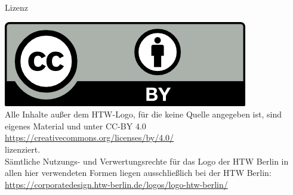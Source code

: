 \documentclass[aspectratio=169,t]{beamer}
\begin{document}
\begin{frame}{Lizenz}
    \begin{center}
        \includegraphics{Bilder/by.png}\\
        Alle Inhalte außer dem HTW-Logo, für die keine Quelle angegeben ist, sind eigenes Material und unter CC-BY 4.0\\
        \url{https://creativecommons.org/licenses/by/4.0/}\\
        lizenziert.\\\vspace{0.5cm}
        Sämtliche Nutzungs- und Verwertungsrechte für das Logo der HTW Berlin in allen hier verwendeten Formen liegen ausschließlich bei der HTW Berlin:\\
        \url{https://corporatedesign.htw-berlin.de/logos/logo-htw-berlin/}
    \end{center}
\end{frame}
\end{document}

